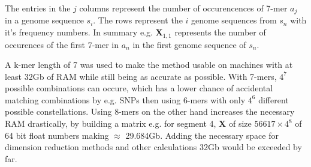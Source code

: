 The entries in the $j$ columns represent the number of occurencences of 7-mer $a_j$ in a genome sequence $s_i$. The rows represent the $i$ genome sequences from $s_n$ with it's frequency numbers. In summary e.g. $\mathbf{X}_{1,1}$ represents the number of occurences of the first 7-mer in $a_n$ in the first genome sequence of $s_n$.

A k-mer length of 7 was used to make the method usable on machines with at least 32Gb of RAM while still being as accurate as possible. With 7-mers, $4^7$ possible combinations can occure, which has a lower chance of accidental matching combinations by e.g. \glspl{SNP} then using 6-mers with only $4^6$ different possible constellations. Using 8-mers on the other hand increases the necessary RAM drastically, by building a matrix e.g. for segment 4, $\mathbf{X}$ of size $56617 \times 4^8$ of 64 bit float numbers making $\approx$ 29.684Gb. Adding the necessary space for dimension reduction methods and other calculations 32Gb would be exceeded by far. 